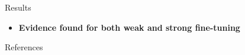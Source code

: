 \documentclass[final]{beamer}
\begin{document}
\begin{frame}{}
\begin{textblock}{34}
\begin{block}{Results}
\begin{itemize}
\item \text{ }\textbf{Evidence found for both weak and strong fine-tuning}
\end{itemize}

\end{block}

\begin{block}{References}\vspace{-1.3cm}
\begin{multicols}{2}
{\tiny
}
\end{multicols}

\end{block}

\end{textblock}

\end{frame}
\end{document}
